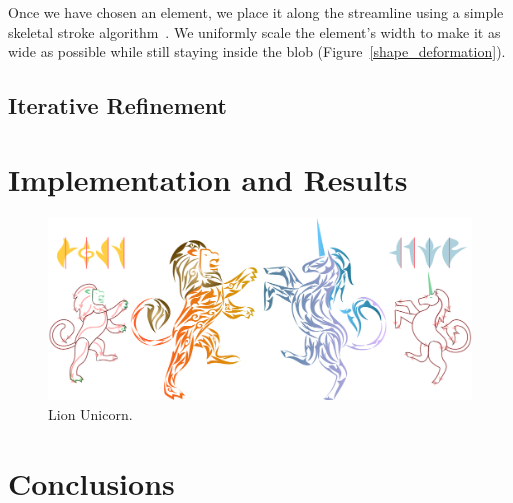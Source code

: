 Once we have chosen an element, we place it along the streamline using a
simple skeletal stroke algorithm~\cite{Hsu93}. We uniformly scale the element's width
to make it as wide as possible while still staying inside the blob
(Figure~\ref{shape_deformation}).

\subsection{Iterative Refinement}
\section{Implementation and Results}

\begin{figure}
\centering
\includegraphics[width=1.0\textwidth]{figures/flowpak/lion_unicorn.pdf} 
\caption{\label{fig_lion_unicorn} 
Lion Unicorn. }
\end{figure}



\section{Conclusions}